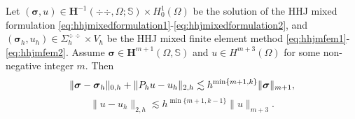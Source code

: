 \begin{theorem}
Let $(\boldsymbol{\sigma} , u)\in \boldsymbol{H}^{-1}(\div\div,\Omega; \mathbb{S})\times H_0^1(\Omega)$ be the solution of the HHJ mixed formulation \eqref{eq:hhjmixedformulation1}-\eqref{eq:hhjmixedformulation2}, and $(\boldsymbol{\sigma}_h, u_h)\in\Sigma_h^{\div\div}\times V_h$ be the HHJ mixed finite element method \eqref{eq:hhjmfem1}-\eqref{eq:hhjmfem2}.
Assume $\boldsymbol{\sigma}\in \boldsymbol{H}^{m+1}(\Omega, \mathbb{S})$ and $u\in H^{m+3}(\Omega)$ for
some non-negative integer $m$.
Then
\begin{equation}\label{eq:hhjenergyerror}
\|\bs\sigma-\bs\sigma_h\|_{0,h}+\|P_hu-u_h\|_{2,h}\lesssim h^{\min\{m+1,k\}}\|\bs\sigma\|_{m+1},%
\end{equation}
\[
\|u-u_h\|_{2,h}\lesssim h^{\min\{m+1,k-1\}}\|u\|_{m+3}.%
\]
\end{theorem}
